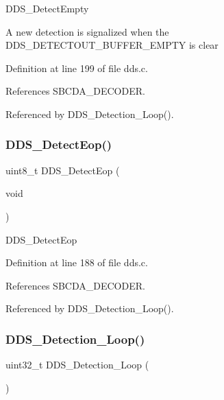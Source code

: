 D\+D\+S\+\_\+\+Detect\+Empty

A new detection is signalized when the D\+D\+S\+\_\+\+D\+E\+T\+E\+C\+T\+O\+U\+T\+\_\+\+B\+U\+F\+F\+E\+R\+\_\+\+E\+M\+P\+TY is clear 

Definition at line 199 of file dds.\+c.



References S\+B\+C\+D\+A\+\_\+\+D\+E\+C\+O\+D\+ER.



Referenced by D\+D\+S\+\_\+\+Detection\+\_\+\+Loop().

\mbox{\label{group___d_d_s_gab9346847068834883c8aa90e94ccf847}} 
\subsubsection{\texorpdfstring{D\+D\+S\+\_\+\+Detect\+Eop()}{DDS\_DetectEop()}}
{\footnotesize\ttfamily uint8\+\_\+t D\+D\+S\+\_\+\+Detect\+Eop (\begin{DoxyParamCaption}\item[{void}]{ }\end{DoxyParamCaption})}

D\+D\+S\+\_\+\+Detect\+Eop 

Definition at line 188 of file dds.\+c.



References S\+B\+C\+D\+A\+\_\+\+D\+E\+C\+O\+D\+ER.



Referenced by D\+D\+S\+\_\+\+Detection\+\_\+\+Loop().

\mbox{\label{group___d_d_s_ga1f53b4fdeb56f560600428473023f819}} 
\subsubsection{\texorpdfstring{D\+D\+S\+\_\+\+Detection\+\_\+\+Loop()}{DDS\_Detection\_Loop()}}
{\footnotesize\ttfamily uint32\+\_\+t D\+D\+S\+\_\+\+Detection\+\_\+\+Loop (\begin{DoxyParamCaption}{ }\end{DoxyParamCaption})}

